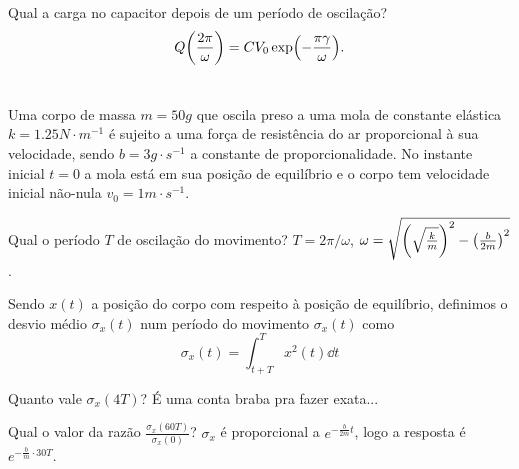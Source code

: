 \documentclass[a4paper,10pt]{article}
\begin{document}
Qual a carga no capacitor depois de um período de oscilação?
$$
Q\qty(\frac{2\pi}{\omega}) = C V_0 \exp(-\frac{\pi \gamma}{\omega}).
$$

\section{}

Uma corpo de massa $m = 50 \unit{g}$ que oscila preso a uma mola de constante elástica $k = 1.25 \unit{N \cdot m^{-1}}$ é sujeito a uma força de resistência do ar proporcional à sua velocidade, sendo $b = 3 \unit{g \cdot s^{-1}}$ a constante de proporcionalidade. No instante inicial $t = 0$ a mola está em sua posição de equilíbrio e o corpo tem velocidade inicial não-nula $v_0 = 1 \unit{m \cdot s^{-1}}$.

Qual o período $T$ de oscilação do movimento? $T = 2 \pi / \omega$, $\omega = \sqrt{\qty(\sqrt{\frac{k}{m}})^2 - \qty(\frac{b}{2m})^2}$.

Sendo $x(t)$ a posição do corpo com respeito à posição de equilíbrio, definimos o desvio médio $\sigma_x(t)$ num período do movimento $\sigma_x(t)$ como
$$
\sigma_x(t) = \int_{t + T}^T x^2(t) \dd{t}
$$

Quanto vale $\sigma_x(4T)$? É uma conta braba pra fazer exata...

Qual o valor da razão $\displaystyle{\frac{\sigma_x(60T)}{\sigma_x(0)}}$? $\sigma_x$ é proporcional a $e^{-\frac{b}{2m}t}$, logo a resposta é $e^{-\frac{b}{m} \cdot 30 T}$.
\end{document}
